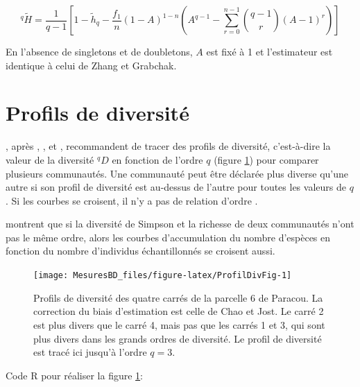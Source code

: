 \documentclass[
  11pt,
  american,
  a4paper,
  extrafontsizes,onecolumn,openright
  ]{memoir}
\begin{document}
\begin{equation}
  ^{q}{\tilde{H}}
    = \frac{1}{q - 1} \left[ 
     1 - \tilde{h}_q - \frac{f_1}{n}{\left( 1 - A \right)}^{1 - n} 
     \left( A^{q - 1} - \sum_{r=0}^{n-1}{\binom{q - 1}{r} {\left( A - 1 \right)}^r} \right) 
    \right]
\end{equation}

En l'absence de singletons et de doubletons, \(A\) est fixé à 1 et l'estimateur est identique à celui de Zhang et Grabchak.

\hypertarget{profils-de-diversituxe9}{%
\section{Profils de diversité}\label{profils-de-diversituxe9}}

\textcite{Leinster2012}, après \textcite{Hill1973}, \textcite{Patil1982}, \textcite{Tothmeresz1995} et \textcite{Kindt2006}, recommandent de tracer des profils de diversité, c'est-à-dire la valeur de la diversité \(^{q}\!D\) en fonction de l'ordre \(q\) (figure \ref{fig:ProfilDivFig}) pour comparer plusieurs communautés.
Une communauté peut être déclarée plus diverse qu'une autre si son profil de diversité est au-dessus de l'autre pour toutes les valeurs de \(q\).
Si les courbes se croisent, il n'y a pas de relation d'ordre \autocite{Tothmeresz1995}.

\textcite{Lande2000} montrent que si la diversité de Simpson et la richesse de deux communautés n'ont pas le même ordre, alors les courbes d'accumulation du nombre d'espèces en fonction du nombre d'individus échantillonnés se croisent aussi.



\scriptsize

\begin{figure}

{\centering \texttt{[image: MesuresBD\_files/figure-latex/ProfilDivFig-1]} 

}

\caption{Profils de diversité des quatre carrés de la parcelle 6 de Paracou. La correction du biais d'estimation est celle de Chao et Jost. Le carré 2 est plus divers que le carré 4, mais pas que les carrés 1 et 3, qui sont plus divers dans les grands ordres de diversité. Le profil de diversité est tracé ici jusqu'à l'ordre \(q = 3\).}\label{fig:ProfilDivFig}
\end{figure}

\normalsize

Code R pour réaliser la figure \ref{fig:ProfilDivFig}:
\end{document}
